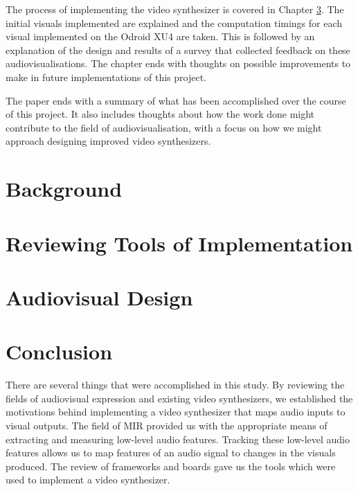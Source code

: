\documentclass{report}
\begin{document}
The process of implementing the video synthesizer is covered in Chapter \ref{chap:avdesign}. The initial visuals implemented are explained and the computation timings for each visual implemented on the Odroid XU4 are taken. This is followed by an explanation of the design and results of a survey that collected feedback on these audiovisualisations. The chapter ends with thoughts on possible improvements to make in future implementations of this project. \par

The paper ends with a summary of what has been accomplished over the course of this project. It also includes thoughts about how the work done might contribute to the field of audiovisualisation, with a focus on how we might approach designing improved video synthesizers.


\chapter{Background}\label{chap:background}




\chapter{Reviewing Tools of Implementation}\label{chap:toolreview}



\chapter{Audiovisual Design}\label{chap:avdesign}






\chapter{Conclusion}
There are several things that were accomplished in this study. By reviewing the fields of audiovisual expression and existing video synthesizers, we established the motivations behind implementing a video synthesizer that maps audio inputs to visual outputs. The field of MIR provided us with the appropriate means of extracting and measuring low-level audio features. Tracking these low-level audio features allows us to map features of an audio signal to changes in the visuals produced. The review of frameworks and boards gave us the tools which were used to implement a video synthesizer.
\end{document}
